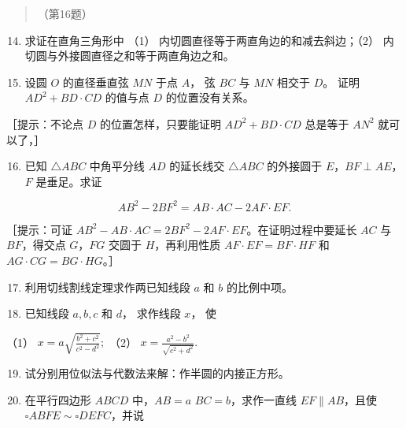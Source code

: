 \begin{quote}
（第16题）
\end{quote}

\begin{enumerate}
\setcounter{enumi}{13}
\item
  求证在直角三角形中 （1） 内切圆直径等于两直角边的和减去斜边；（2）
  内切圆与外接圆直径之和等于两直角边之和。
\item
  设圆 \(O\) 的直径垂直弦 \(MN\) 于点 \(A\)， 弦 \(BC\) 与 \(MN\) 相交于
  \(D\)。 证明 \(AD^2 + BD \cdot CD\) 的值与点 \(D\) 的位置没有关系。
\end{enumerate}

［提示：不论点 \(D\) 的位置怎样，只要能证明 \(AD^2 + BD \cdot CD\)
总是等于 \(AN^2\) 就可以了，］

\begin{enumerate}
\setcounter{enumi}{15}
\item
  已知 \(\triangle ABC\) 中角平分线 \(AD\) 的延长线交 \(\triangle ABC\)
  的外接圆于 \(E\)，\(BF\perp AE\)，\(F\) 是垂足。求证
\end{enumerate}

\[
AB^2-2BF^2=AB\cdot AC-2AF\cdot EF.
\]

［提示：可证 \(AB^2-AB\cdot AC=2BF^2-2AF\cdot EF\)。在证明过程中要延长
\(AC\) 与 \(BF\)，得交点 \(G\)，\(FG\) 交圆于 \(H\)，再利用性质
\(AF\cdot EF=BF\cdot HF\) 和 \(AG\cdot CG=BG\cdot HG\)。］

\begin{enumerate}
\setcounter{enumi}{16}
\item
  利用切线割线定理求作两已知线段 \(a\) 和 \(b\) 的比例中项。
\item
  已知线段 \(a, b, c\) 和 \(d\)， 求作线段 \(x\)， 使
\end{enumerate}

（1） \(x = a\sqrt{\frac{b^2 + c^2}{c^2 - d^2}};\) （2）
\(x = \frac{a^2 - b^2}{\sqrt{c^2 + d^2}}.\)

\begin{enumerate}
\setcounter{enumi}{18}
\item
  试分别用位似法与代数法来解：作半圆的内接正方形。
\item
  在平行四边形 \(ABCD\) 中，\(AB = a\) \(BC = b\)，求作一直线
  \(EF \parallel AB\)，且使 \(\square ABFE\sim \square DEFC\)，并说
\end{enumerate}

